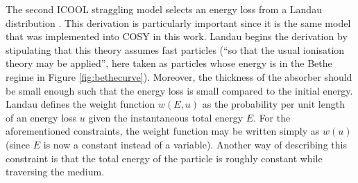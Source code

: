 The second ICOOL straggling model selects an energy loss from a Landau distribution \cite{landau}. This derivation is particularly important since it is the same model that was implemented into COSY in this work. Landau begins the derivation by stipulating that this theory assumes fast particles (``so that the usual ionisation theory may be applied'', here taken as particles whose energy is in the Bethe regime in Figure \ref{fig:bethecurve}). Moreover, the thickness of the absorber should be small enough such that the energy loss is small compared to the initial energy. Landau defines the weight function $w(E,u)$ as the probability per unit length of an energy loss $u$ given the instantaneous total energy $E$. For the aforementioned constraints, the weight function may be written simply as $w(u)$ (since $E$ is now a constant instead of a variable). Another way of describing this constraint is that the total energy of the particle is roughly constant while traversing the medium.

